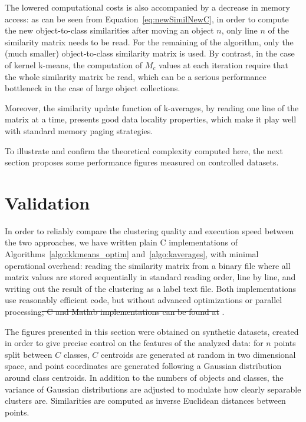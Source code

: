 \documentclass[natbib,smallextended]{svjour3}
\providecommand{\DIFdeltex}[1]{{\protect\color{red}\sout{#1}}}                      %
\providecommand{\DIFdelbegin}{} %
\providecommand{\DIFdelend}{} %
\providecommand{\DIFdel}[1]{\texorpdfstring{\DIFdeltex{#1}}{}} %
\newcommand{\DIFscaledelfig}{0.5}
\newlength{\DIFdelgraphicswidth} %
\newlength{\DIFdelgraphicsheight} %
\newcommand{\DIFdelincludegraphics}[2][]{%
\sbox{\DIFdelgraphicsbox}{\DIFOincludegraphics[#1]{#2}}%
\settoboxwidth{\DIFdelgraphicswidth}{\DIFdelgraphicsbox} %
\settoboxtotalheight{\DIFdelgraphicsheight}{\DIFdelgraphicsbox} %
\scalebox{\DIFscaledelfig}{%
\parbox[b]{\DIFdelgraphicswidth}{\usebox{\DIFdelgraphicsbox}\\[-\baselineskip] \rule{\DIFdelgraphicswidth}{0em}}\llap{\resizebox{\DIFdelgraphicswidth}{\DIFdelgraphicsheight}{%
\setlength{\unitlength}{\DIFdelgraphicswidth}%
\begin{picture}(1,1)%
\thicklines\linethickness{2pt} %
{\color[rgb]{1,0,0}\put(0,0){\framebox(1,1){}}}%
{\color[rgb]{1,0,0}\put(0,0){\line( 1,1){1}}}%
{\color[rgb]{1,0,0}\put(0,1){\line(1,-1){1}}}%
\end{picture}%
}\hspace*{3pt}}} %
} %
\DeclareRobustCommand{\DIFdelbegin}{\DIFOdelbegin \let\includegraphics\DIFdelincludegraphics} %
\DeclareRobustCommand{\DIFdelend}{\DIFOaddend \let\includegraphics\DIFOincludegraphics} %
\begin{document}
The lowered computational costs is also accompanied by a decrease in memory access: as can be seen from Equation~\ref{eq:newSimilNewC}, in order to compute the new object-to-class similarities after moving an object $n$, only line $n$ of the similarity matrix needs to be read. For the remaining of the algorithm, only the (much smaller) object-to-class similarity matrix is used. By contrast, in the case of kernel k-means, the computation of $M_c$ values at each iteration require that the whole similarity matrix be read, which can be a serious performance bottleneck in the case of large object collections.

Moreover, the similarity update function of k-averages, by reading one line of the matrix at a time, presents good data locality properties, which make it play well with standard memory paging strategies.

To illustrate and confirm the theoretical complexity computed here, the next section proposes some performance figures measured on controlled datasets.

\section{Validation}
\label{sec:validation}

In order to reliably compare the clustering quality and execution speed between the two approaches, we have written plain C implementations of Algorithms~\ref{algo:kkmeans_optim} and~\ref{algo:kaverages}, with minimal operational overhead: reading the similarity matrix from a binary file where all matrix values are stored sequentially in standard reading order, line by line, and writing out the result of the clustering as a label text file. Both implementations use reasonably efficient code, but without advanced optimizations or parallel processing\DIFdelbegin \DIFdel{; C and Matlab implementations can be found at}%
\DIFdelend .	%

The figures presented in this section were obtained on synthetic datasets, created in order to give precise control on the features of the analyzed data: for $n$ points split between $C$ classes, $C$ centroids are generated at random in two dimensional space, and point coordinates are generated following a Gaussian distribution around class centroids. In addition to the numbers of objects and classes, the variance of Gaussian distributions are adjusted to modulate how clearly separable clusters are. Similarities are computed as inverse Euclidean distances between points. %
\end{document}
